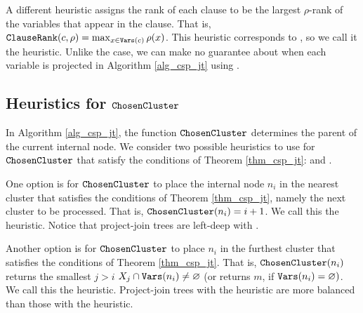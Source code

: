 A different heuristic assigns the rank of each clause to be the largest $\rho$-rank of the variables that appear in the clause.
That is, $\texttt{\upshape ClauseRank}(c, \rho) = \max_{x \in \texttt{\upshape Vars}(c)} \rho(x)$.
This heuristic corresponds to  \cite{bouquet1999gestion}, so we call it the \Bm{} heuristic.
Unlike the \Be{} case, we can make no guarantee about when each variable is projected in Algorithm \ref{alg_csp_jt} using \Bm{}.


\subsection{Heuristics for \texorpdfstring{$\texttt{\upshape ChosenCluster}$}{ChosenCluster}}

In Algorithm \ref{alg_csp_jt}, the function $\texttt{\upshape ChosenCluster}$ determines the parent of the current internal node.
We consider two possible heuristics to use for $\texttt{\upshape ChosenCluster}$ that satisfy the conditions of Theorem \ref{thm_csp_jt}:  and  \cite{DPV20}.

One option is for $\texttt{\upshape ChosenCluster}$ to place the internal node $n_i$ in the nearest cluster that satisfies the conditions of Theorem \ref{thm_csp_jt}, namely the next cluster to be processed.
That is, $\texttt{\upshape ChosenCluster}(n_i) = i + 1$.
We call this the  heuristic.
Notice that project-join trees are left-deep with \ListH{}.

Another option is for $\texttt{\upshape ChosenCluster}$ to place $n_i$ in the furthest cluster that satisfies the conditions of Theorem \ref{thm_csp_jt}.
That is, $\texttt{\upshape ChosenCluster}(n_i)$ returns the smallest $j > i$ \st{} $X_j \cap \texttt{\upshape Vars}(n_i) \ne \varnothing$ (or returns $m$, if $\texttt{\upshape Vars}(n_i) = \varnothing)$.
We call this the  heuristic.
Project-join trees with the \TreeH{} heuristic are more balanced than those with the \ListH{} heuristic.
